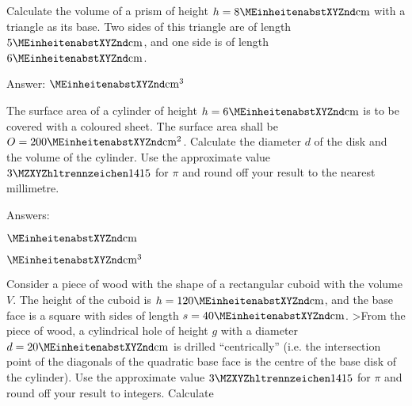 \begin{MExercises}

\begin{MExercise}
Calculate the volume of a prism of height $h = 8\MEinheit{cm}$ with a triangle
as its base. Two sides of this triangle are of length $5\MEinheit{cm}$, 
and one side is of length $6\MEinheit{cm}$.
\par
Answer: $\MEinheit{cm}^3$
\end{MExercise}

\begin{MExercise}
The surface area of a cylinder of height $h = 6\MEinheit{cm}$ is to be covered 
with a coloured sheet. The surface area shall be $O = 200\MEinheit{cm}^2$. 
Calculate the diameter $d$ of the disk and the volume of the cylinder. Use the approximate value $\MZahl{3}{1415}$ for 
$\pi$ and round off your result 
to the nearest millimetre.


Answers:
\begin{MExerciseItems}
\item %
 $\MEinheit{cm}$
\item %
 $\MEinheit{cm}^3$
\end{MExerciseItems}
\end{MExercise}

\begin{MExercise}
Consider a piece of wood with the shape of a rectangular cuboid with the volume
$V$. The height of the cuboid is $h = 120\MEinheit{cm}$, and the 
base face is a square with sides of length $s = 40\MEinheit{cm}$.
>From the piece of wood, a cylindrical hole of height $g$ with a diameter 
$d = 20\MEinheit{cm}$ is drilled ``centrically'' (i.e. the intersection 
point of the diagonals of the quadratic base face is the centre of the 
base disk of the cylinder). Use the approximate value 
$\MZahl{3}{1415}$ for $\pi$ and round off your result to integers. Calculate


\end{MExercise}
\end{MExercises}
